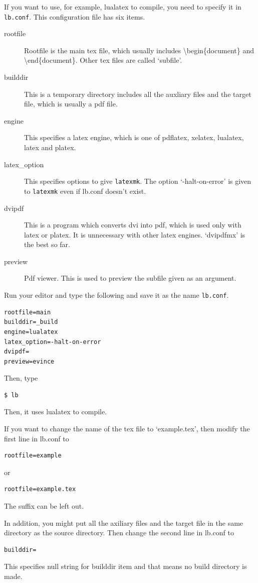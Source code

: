 If you want to use, for example, lualatex to compile, you need to specify it in \verb|lb.conf|.
This configuration file has six items.
\begin{description}
\item[rootfile] Rootfile is the main tex file, which usually includes {\textbackslash}begin\{document\} and {\textbackslash}end\{document\}. Other tex files are called `subfile'.
\item[builddir] This is a temporary directory includes all the auxliary files and the target file, which is usually a pdf file.
\item[engine] This specifies a latex engine, which is one of pdflatex, xelatex, lualatex, latex and platex.
\item[latex\_option] This specifies options to give \verb|latexmk|. The option `-halt-on-error' is given to \verb|latexmk| even if lb.conf doesn't exist.
\item[dvipdf] This is a program which converts dvi into pdf, which is used only with latex or platex. It is unnecessary with other latex engines. `dvipdfmx' is the best so far.
\item[preview] Pdf viewer. This is used to preview the subfile given as an argument.
\end{description}

Run your editor and type the following and save it as the name \verb|lb.conf|.
\begin{verbatim}
rootfile=main
builddir=_build
engine=lualatex
latex_option=-halt-on-error
dvipdf=
preview=evince
\end{verbatim}
Then, type
\begin{verbatim}
$ lb
\end{verbatim}
Then, it uses lualatex to compile.

If you want to change the name of the tex file to `example.tex', then modify the first line in lb.conf to
\begin{verbatim}
rootfile=example
\end{verbatim}
or
\begin{verbatim}
rootfile=example.tex
\end{verbatim}
The suffix can be left out.

In addition, you might put all the axiliary files and the target file in the same directory as the source directory.
Then change the second line in lb.conf to
\begin{verbatim}
builddir=
\end{verbatim}
This specifies null string for builddir item and that means no build directory is made.


